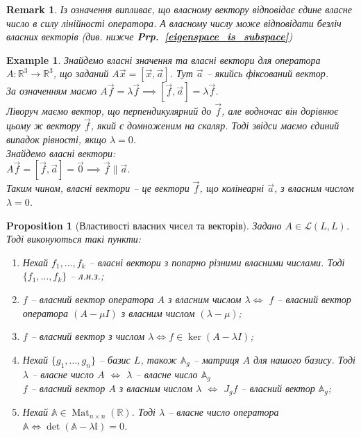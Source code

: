 \documentclass[a4paper, 10pt]{article}
\theoremstyle{theoremdd}
\newtheorem{example}[theorem]{Example}
\newtheorem{proposition}[theorem]{Proposition}
\newtheorem{remark}[theorem]{Remark}
\newcommand\prpref[1]{\textbf{Prp.~\ref{#1}}}
\DeclareMathOperator{\Mat}{Mat}
\begin{document}
\begin{remark}
Із означення випливає, що власному вектору відповідає \emph{єдине} власне число в силу лінійності оператора. А власному числу може відповідати безліч власних векторів (див. нижче \prpref{eigenspace_is_subspace})
\end{remark}

\begin{example}
Знайдемо власні значення та власні вектори для оператора $A \colon \mathbb{R}^3 \to \mathbb{R}^3$, що заданий $A\vec{x} = [\vec{x}, \vec{a}]$. Тут $\vec{a}$ -- якийсь фіксований вектор.\\
За означенням маємо $A\vec{f} = \lambda \vec{f} \implies [\vec{f},\vec{a}] = \lambda \vec{f}$.\\
Ліворуч маємо вектор, що перпендикулярний до $\vec{f}$, але водночас він дорівнює цьому ж вектору $\vec{f}$, який є домноженим на скаляр. Тоді звідси маємо єдиний випадок рівності, якщо $\lambda = 0$.\\
Знайдемо власні вектори:\\
$A\vec{f} = [\vec{f}, \vec{a}] = \vec{0} \implies \vec{f} \parallel \vec{a}$.\\
Таким чином, власні вектори -- це вектори $\vec{f}$, що колінеарні $\vec{a}$, з власним числом $\lambda = 0$.
\end{example}

\begin{proposition}[Властивості власних чисел та векторів]
Задано $A \in \mathcal{L}(L,L)$. Тоді виконуються такі пункти:
\begin{enumerate}[nosep, wide=0pt, label={\arabic*)}]
\item Нехай $f_1,\dots,f_k$ -- власні вектори з попарно різними власними числами. Тоді $\{f_1,\dots,f_k\}$ -- л.н.з.;
\item $f$ -- власний вектор оператора $A$ з власним числом $\lambda \iff$ $f$ -- власний вектор оператора $(A - \mu I)$ з власним числом $(\lambda - \mu)$;
\item $f$ -- власний вектор з числом $\lambda \iff f \in \ker(A-\lambda I)$;
\item Нехай $\{g_1,\dots,g_n\}$ -- базис $L$, також $\mathbb{A}_g$ -- матриця $A$ для нашого базису.
Тоді \\
$\lambda$ -- власне число $A$ $\iff$ $\lambda$ -- власне число $\mathbb{A}_g$\\
$f$ -- власний вектор $A$ з власним числом $\lambda$ $\iff$ $J_g f$ -- власний вектор $\mathbb{A}_g$;
\item Нехай $\mathbb{A} \in \Mat_{n \times n}(\mathbb{R})$. Тоді $\lambda$ -- власне число оператора $\mathbb{A} \iff \det (\mathbb{A} - \lambda \mathbb{I}) = 0$.
\end{enumerate}
\end{proposition}
\end{document}
